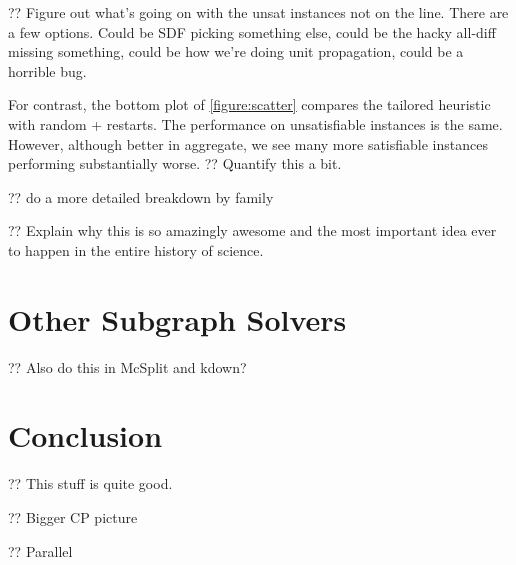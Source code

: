 \documentclass{article}
\begin{document}
?? Figure out what's going on with the unsat instances not on the line. There are a few options.
Could be SDF picking something else, could be the hacky all-diff missing something, could be how
we're doing unit propagation, could be a horrible bug.

For contrast, the bottom plot of \cref{figure:scatter} compares the tailored heuristic with random +
restarts. The performance on unsatisfiable instances is the same. However, although better in
aggregate, we see many more satisfiable instances performing substantially worse. ?? Quantify this a
bit.

?? do a more detailed breakdown by family

?? Explain why this is so amazingly awesome and the most important idea ever to happen in the entire
history of science.

\section{Other Subgraph Solvers}

?? Also do this in McSplit and kdown?

\section{Conclusion}

?? This stuff is quite good.

?? Bigger CP picture

?? Parallel



\end{document}
